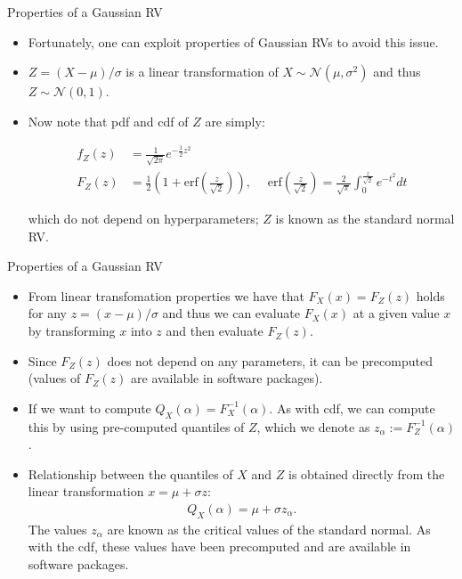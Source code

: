 \documentclass[9pt]{beamer}
\begin{document}
%
\begin{frame}{Properties of a Gaussian RV}

\begin{itemize}
\setlength{\itemsep}{10pt}
\item Fortunately, one can exploit properties of Gaussian RVs to avoid this issue. 

\item $Z=(X-\mu)/\sigma$ is a linear transformation of $X\sim \mathcal{N}(\mu,\sigma^2)$ and thus $Z\sim \mathcal{N}(0,1)$. 

\item Now note that pdf and cdf of $Z$ are simply:
\begin{block}{}
\begin{align*}
f_Z(z)&=\frac{1}{\sqrt{2\pi}}e^{-\frac{1}{2}z^2}\\
F_Z\left(z\right)&=\frac{1}{2}\left(1+\textrm{erf}\left(\frac{z}{\sqrt{2}}\right)\right),\; \quad \textrm{erf}\left(\frac{z}{\sqrt{2}}\right)=\frac{2}{\sqrt{\pi}}\int_0^{\frac{z}{\sqrt{2}}}e^{-t^2}dt
\end{align*}
\end{block}
which do not depend on hyperparameters; $Z$ is known as the standard normal RV. 
\end{itemize}

\end{frame}


%
\begin{frame}{Properties of a Gaussian RV}

\begin{itemize}
\setlength{\itemsep}{10pt}
\item From linear transfomation properties we have that $F_X(x)=F_Z(z)$ holds for any $z=(x-\mu)/\sigma$ and thus we can evaluate $F_X(x)$ at a given value $x$ by transforming $x$ into $z$ and then evaluate $F_Z(z)$. 

\item Since $F_Z(z)$ does not depend on any parameters, it can be precomputed (values of $F_Z(z)$ are available in software packages). 

\item If we want to compute $Q_X(\alpha)=F^{-1}_X(\alpha)$. As with cdf, we can compute this by using pre-computed quantiles of $Z$, which we denote as $z_\alpha:=F_Z^{-1}(\alpha)$. 

\item Relationship between the quantiles of $X$ and $Z$ is obtained directly from the linear transformation $x=\mu+\sigma z$:
\begin{align*}
Q_X(\alpha)=\mu+\sigma z_\alpha.
\end{align*}
The values $z_\alpha$ are known as the critical values of the standard normal. As with the cdf, these values have been precomputed and are available in software packages. 
\end{itemize}

\end{frame}
\end{document}
